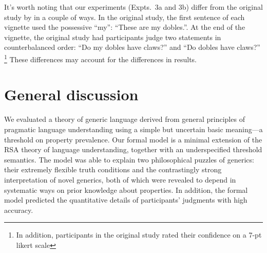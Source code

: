 \documentclass[12pt,letterpaper]{article}
\begin{document}
It's worth noting that our experiments (Expts.~3a and 3b) differ from the original study by \citeauthor{Gelman2007} in a couple of ways.
In the original study, the first sentence of each vignette used the possessive ``my'': ``These are my dobles.''.
At the end of the vignette, the original study had participants judge two statements in counterbalanced order: ``Do my dobles have claws?'' and ``Do dobles have claws?'' \footnote{In addition, participants in the original study rated their confidence on a 7-pt likert scale}
These differences may account for the differences in results.

\section*{General discussion}

We evaluated a theory of generic language derived from general principles of pragmatic language understanding using a simple but uncertain basic meaning---a threshold on property prevalence.
Our formal model is a minimal extension of the RSA theory of language understanding, together with an underspecified threshold semantics.
The model was able to explain two philosophical puzzles of generics: their extremely flexible truth conditions and the contrastingly strong interpretation of novel generics, both of which were revealed to depend in systematic ways on prior knowledge about properties. In addition, the formal model predicted the quantitative details of participants' judgments with high accuracy.

\end{document}
